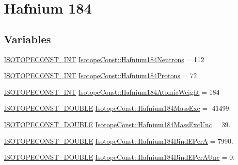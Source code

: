 \hypertarget{group___isotope_const-_hafnium-_hf184}{}\section{Hafnium 184}
\label{group___isotope_const-_hafnium-_hf184}
\subsection*{Variables}
\begin{DoxyCompactItemize}
\item 
\mbox{\hyperlink{group___isotope_const-_macros_ga5f18360b3e99483a35c32d789e62621c}{I\+S\+O\+T\+O\+P\+E\+C\+O\+N\+S\+T\+\_\+\+I\+NT}} \mbox{\hyperlink{group___isotope_const-_hafnium-_hf184_ga6eed64729fe5fe488eb3cf3976b71c16}{Isotope\+Const\+::\+Hafnium184\+Neutrons}} = 112
\item 
\mbox{\hyperlink{group___isotope_const-_macros_ga5f18360b3e99483a35c32d789e62621c}{I\+S\+O\+T\+O\+P\+E\+C\+O\+N\+S\+T\+\_\+\+I\+NT}} \mbox{\hyperlink{group___isotope_const-_hafnium-_hf184_ga145addbdc33d156a88e6834e1fce72e3}{Isotope\+Const\+::\+Hafnium184\+Protons}} = 72
\item 
\mbox{\hyperlink{group___isotope_const-_macros_ga5f18360b3e99483a35c32d789e62621c}{I\+S\+O\+T\+O\+P\+E\+C\+O\+N\+S\+T\+\_\+\+I\+NT}} \mbox{\hyperlink{group___isotope_const-_hafnium-_hf184_gae2124f094ce0e1d714602415cac60e43}{Isotope\+Const\+::\+Hafnium184\+Atomic\+Weight}} = 184
\item 
\mbox{\hyperlink{group___isotope_const-_macros_ga8f45a7272ce02c0b4c65c44636ed719a}{I\+S\+O\+T\+O\+P\+E\+C\+O\+N\+S\+T\+\_\+\+D\+O\+U\+B\+LE}} \mbox{\hyperlink{group___isotope_const-_hafnium-_hf184_ga94a87b6ce593e097f009a3f9691684b0}{Isotope\+Const\+::\+Hafnium184\+Mass\+Exc}} = -\/41499.
\item 
\mbox{\hyperlink{group___isotope_const-_macros_ga8f45a7272ce02c0b4c65c44636ed719a}{I\+S\+O\+T\+O\+P\+E\+C\+O\+N\+S\+T\+\_\+\+D\+O\+U\+B\+LE}} \mbox{\hyperlink{group___isotope_const-_hafnium-_hf184_ga58160aa6b195e27433348b6067664318}{Isotope\+Const\+::\+Hafnium184\+Mass\+Exc\+Unc}} = 39.
\item 
\mbox{\hyperlink{group___isotope_const-_macros_ga8f45a7272ce02c0b4c65c44636ed719a}{I\+S\+O\+T\+O\+P\+E\+C\+O\+N\+S\+T\+\_\+\+D\+O\+U\+B\+LE}} \mbox{\hyperlink{group___isotope_const-_hafnium-_hf184_gaf1474360e931102e22ef5b73a226bf00}{Isotope\+Const\+::\+Hafnium184\+Bind\+E\+PerA}} = 7990.
\item 
\mbox{\hyperlink{group___isotope_const-_macros_ga8f45a7272ce02c0b4c65c44636ed719a}{I\+S\+O\+T\+O\+P\+E\+C\+O\+N\+S\+T\+\_\+\+D\+O\+U\+B\+LE}} \mbox{\hyperlink{group___isotope_const-_hafnium-_hf184_ga6e1d276a76fb529eaa539a788ba35716}{Isotope\+Const\+::\+Hafnium184\+Bind\+E\+Per\+A\+Unc}} = 0.

\end{DoxyCompactItemize}
